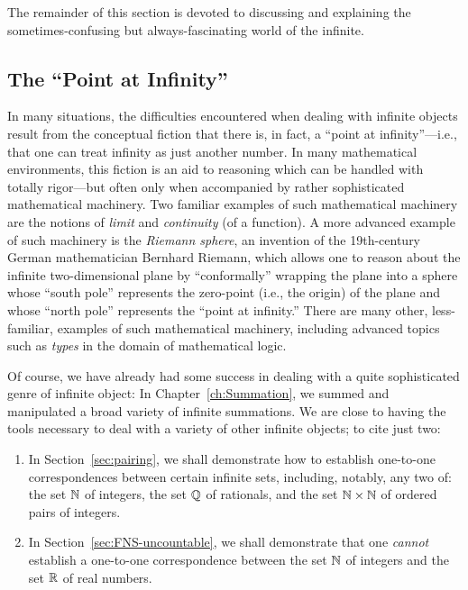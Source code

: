 \medskip

The remainder of this section is devoted to discussing and explaining the sometimes-confusing but always-fascinating world of the infinite.

\subsection{The ``Point at Infinity''}
\label{sec:point-at-infinity}

   
In many situations, the difficulties encountered when dealing with infinite objects result from the conceptual fiction that there is, in fact, a ``point at infinity''---i.e., that one can treat infinity as just
another number.  In many mathematical environments, this fiction is an aid to reasoning which can be handled with totally rigor---but often only when accompanied by rather sophisticated mathematical machinery.  Two familiar examples of such mathematical machinery are the notions
of  {\it limit} and {\it continuity} (of a function).  A more advanced example of such machinery is the {\it Riemann sphere}, an invention of the 19th-century German mathematician Bernhard Riemann, which allows one to reason about the infinite two-dimensional plane by ``conformally'' wrapping the plane into a sphere whose ``south pole'' represents the zero-point (i.e., the origin) of the plane and whose ``north pole'' represents the ``point at infinity.''  There are many other, less-familiar, examples of such mathematical machinery, including advanced topics such as {\it types} in the domain of mathematical logic.

\medskip

Of course, we have already had some success in dealing with a quite sophisticated genre of infinite object:  In Chapter~\ref{ch:Summation}, we summed and manipulated a broad variety of infinite summations.  We are close to having the tools necessary to deal with a variety of other infinite objects; to cite just two:
\begin{enumerate}
\item
In Section~\ref{sec:pairing}, we shall demonstrate how to establish one-to-one correspondences between certain infinite sets, including, notably, any two of: the set $\mathbb{N}$ of integers, the set $\mathbb{Q}$ of rationals, and the set $\mathbb{N} \times \mathbb{N}$ of ordered pairs of integers.

\medskip\item
In Section~\ref{sec:FNS-uncountable}, we shall demonstrate that one {\em cannot} establish a one-to-one correspondence between the set $\mathbb{N}$ of integers and the set $\mathbb{R}$ of real numbers.
\end{enumerate}

